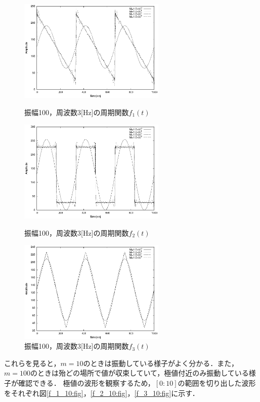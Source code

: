 \documentclass[titlepage]{jarticle}
\begin{document}
\begin{figure}[H]
  \begin{minipage}{0.495\hsize}
    \centering
    \includegraphics[width=7cm]{EPS/task_1.eps}
    \caption{振幅100，周波数3[Hz]の周期関数$f_{1}(t)$}
    \label{f_1:fig}
  \end{minipage}
  \begin{minipage}{0.495\hsize}
    \centering
    \includegraphics[width=7cm]{EPS/task_2.eps}
    \caption{振幅100，周波数3[Hz]の周期関数$f_{2}(t)$}
    \label{f_2:fig}
  \end{minipage}
  \begin{minipage}{0.495\hsize}
    \centering
    \includegraphics[width=7cm]{EPS/task_3.eps}
    \caption{振幅100，周波数3[Hz]の周期関数$f_{3}(t)$}
    \label{f_3:fig}
  \end{minipage}
\end{figure}
これらを見ると，$m=10$のときは振動している様子がよく分かる．また，$m=100$のときは殆どの場所で値が収束していて，極値付近のみ振動している様子が確認できる．
極値の波形を観察するため，$[0:10]$の範囲を切り出した波形をそれぞれ図\ref{f_1_10:fig}，\ref{f_2_10:fig}，\ref{f_3_10:fig}に示す．
\end{document}
